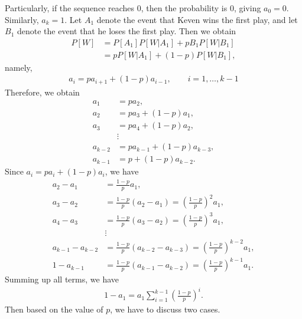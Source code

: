 Particularly, if the sequence reaches 0, then the probability is 0, giving $a_0 = 0$. Similarly, $a_k = 1$. Let $A_1$ denote the event that Keven wins the first play, and let $B_1$ denote the event that he loses the first play. Then we obtain
\begin{align*}
P[W] & = P[A_1]P[W|A_1] + p{B_1}P[W|B_1] \\
& = pP[W|A_1] + (1 - p)P[W|B_1],
\end{align*}
namely,
\begin{align*}
a_i = pa_{i+1} + (1-p)a_{i-1}, \qquad i = 1, \ldots, k-1
\end{align*}
Therefore, we obtain
\begin{align*}
a_1 & = pa_2, \\
a_2 & = pa_3 + (1-p)a_1, \\
a_3 & = pa_4 + (1-p)a_2, \\
& \vdots \\
a_{k-2} & = pa_{k-1} + (1-p)a_{k-3}, \\
a_{k-1} & = p + (1-p)a_{k-2}.
\end{align*}
Since $a_i = pa_i + (1-p)a_i$, we have
\begin{align*}
a_2 - a_1 & = \frac{1-p}{p}a_1, \\
a_3 - a_2 & = \frac{1-p}{p}(a_2 - a_1) = \left(\frac{1-p}{p} \right)^2 a_1, \\
a_4 - a_3 & = \frac{1-p}{p}(a_3 - a_2) = \left(\frac{1-p}{p} \right)^3 a_1, \\
& \vdots \\
a_{k-1} - a_{k-2} & = \frac{1-p}{p}(a_{k-2} - a_{k-3}) = \left(\frac{1-p}{p} \right)^{k-2} a_1, \\
1 - a_{k-1} & = \frac{1-p}{p}(a_{k-1} - a_{k-2}) = \left(\frac{1-p}{p} \right)^{k-1} a_1.
\end{align*}
Summing up all terms, we have
\begin{align*}
1 - a_1 = a_1 \sum_{i=1}^{k-1} \left(\frac{1-p}{p} \right)^i.
\end{align*}
Then based on the value of $p$, we have to discuss two cases.
